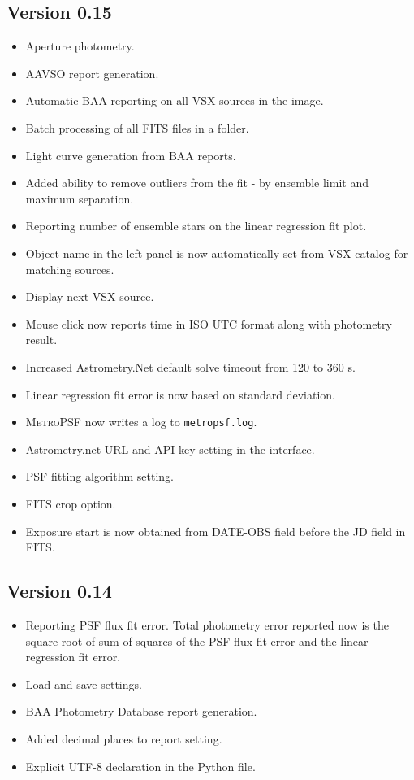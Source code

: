 \documentclass{article}
\begin{document}
\subsection{Version 0.15}
\begin{itemize}
\item Aperture photometry.
\item AAVSO report generation.
\item Automatic BAA reporting on all VSX sources in the image.
\item Batch processing of all FITS files in a folder.
\item Light curve generation from BAA reports.
\item Added ability to remove outliers from the fit - by ensemble limit and maximum separation. 
\item Reporting number of ensemble stars on the linear regression fit plot.
\item Object name in the left panel is now automatically set from VSX catalog for matching sources.
\item Display next VSX source.
\item Mouse click now reports time in ISO UTC format along with photometry result.
\item Increased Astrometry.Net default solve timeout from 120 to 360 s.
\item Linear regression fit error is now based on standard deviation.
\item \textsc{MetroPSF} now writes a log to \texttt{metropsf.log}.
\item Astrometry.net URL and API key setting in the interface.
\item PSF fitting algorithm setting.
\item FITS crop option.
\item Exposure start is now obtained from DATE-OBS field before the JD field in FITS.
\end{itemize}


\subsection{Version 0.14}
\begin{itemize}
\item Reporting PSF flux fit error. Total photometry error reported now is the square root of sum of squares of the PSF flux fit error and the linear regression fit error. 
\item Load and save settings.
\item BAA Photometry Database report generation.
\item Added decimal places to report setting.
\item Explicit UTF-8 declaration in the Python file. 
\end{itemize}
\end{document}
